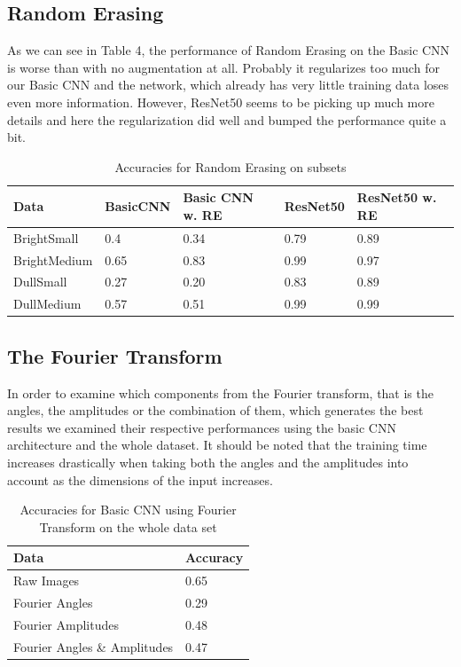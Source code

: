 \documentclass{article}
\begin{document}
\subsection{Random Erasing}

As we can see in Table 4, the performance of Random Erasing on the Basic CNN is worse than with no augmentation at all. Probably it regularizes too much for our Basic CNN and the network, which already has very little training data loses even more information. However, ResNet50 seems to be picking up much more details and here the regularization did well and bumped the performance quite a bit. 

\begin{table}[H]
	\caption{Accuracies for Random Erasing on subsets}
	\label{sample-table}
	\centering
	\begin{tabular}{lllll}
		\toprule
		Data & BasicCNN & Basic CNN w. RE & ResNet50 & ResNet50 w. RE \\
		\midrule
		BrightSmall   & 0.4 & 0.34 & 0.79 & 0.89  \\
		BrightMedium  & 0.65 & 0.83 & 0.99 & 0.97  \\
		DullSmall     & 0.27 & 0.20 & 0.83 & 0.89  \\
		DullMedium    & 0.57 & 0.51 & 0.99 & 0.99  \\
		\bottomrule
	\end{tabular}
\end{table}



\subsection{The Fourier Transform}

In order to examine which components from the Fourier transform, that is the angles, the amplitudes or the combination of them, which generates the best results we examined their respective performances using the basic CNN architecture and the whole dataset. It should be noted that the training time increases drastically when taking both the angles and the amplitudes into account as the dimensions of the input increases.

\begin{table}[H]
  \caption{Accuracies for Basic CNN using Fourier Transform on the whole data set}
  \label{sample-table}
  \centering
  \begin{tabular}{ll}
    \toprule
    Data & Accuracy \\
    \midrule
    Raw Images  & 0.65 \\
    Fourier Angles & 0.29   \\
    Fourier Amplitudes & 0.48 \\
    Fourier Angles \& Amplitudes & 0.47 \\
    \bottomrule
  \end{tabular}
\end{table}
\end{document}
